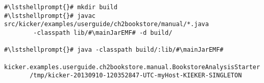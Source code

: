 \begin{lstlisting}[caption=Commands to compile and run the analysis under \UnixLikeSystems{},label=lst:bookstoreAnalysisStarterLinux] 			
#\lstshellprompt{}# mkdir build
#\lstshellprompt{}# javac src/kicker/examples/userguide/ch2bookstore/manual/*.java 
        -classpath lib/#\mainJarEMF# -d build/

#\lstshellprompt{}# java -classpath build/:lib/#\mainJarEMF#
       kicker.examples.userguide.ch2bookstore.manual.BookstoreAnalysisStarter 
       /tmp/kicker-20130910-120352847-UTC-myHost-KIEKER-SINGLETON
\end{lstlisting}	